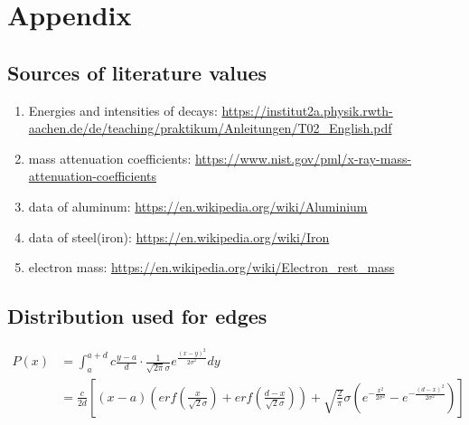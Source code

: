 \documentclass{article}
\begin{document}
\newpage

\section{Appendix}

\subsection{Sources of literature values}

\begin{enumerate}
    \item Energies and intensities of decays: \url{https://institut2a.physik.rwth-aachen.de/de/teaching/praktikum/Anleitungen/T02_English.pdf}
    \item mass attenuation coefficients: \url{https://www.nist.gov/pml/x-ray-mass-attenuation-coefficients}
    \item data of aluminum: \url{https://en.wikipedia.org/wiki/Aluminium}
    \item data of steel(iron): \url{https://en.wikipedia.org/wiki/Iron}
    \item electron mass: \url{https://en.wikipedia.org/wiki/Electron_rest_mass}
\end{enumerate}


\subsection{Distribution used for edges}
    \begin{align*}
        P(x) &= \int_{a}^{a+d} c\frac{y-a}{d}\cdot\frac{1}{\sqrt{2\pi}\sigma}e^{\frac{(x-y)^2}{2\sigma^2}} dy\\
        &= \frac{c}{2d} \left[ (x-a)\left(erf\left(\frac{x}{\sqrt{2}\sigma}\right) + erf\left(\frac{d-x}{\sqrt{2}\sigma}\right) \right)
        + \sqrt{\frac{2}{\pi}}\sigma \left( e^{-\frac{x^2}{2\sigma^2}} - e^{-\frac{(d-x)^2}{2\sigma^2}} \right) \right]
    \end{align*}
    
\end{document}
